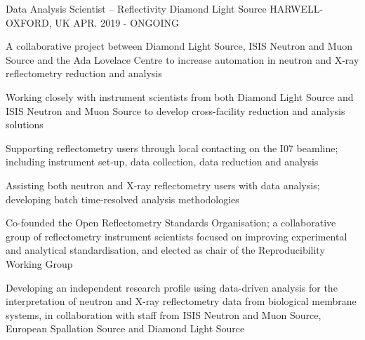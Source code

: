 \begin{cventries}
  \cventry
    {Data Analysis Scientist -- Reflectivity}
    {Diamond Light Source}
    {HARWELL-OXFORD, UK}
    {APR. 2019 - ONGOING}
    {
      \begin{cvitems}
        \item {A collaborative project between Diamond Light Source, ISIS Neutron and Muon Source and the Ada Lovelace Centre to increase automation in neutron and X-ray reflectometry reduction and analysis}
        \item {Working closely with instrument scientists from both Diamond Light Source and ISIS Neutron and Muon Source to develop cross-facility reduction and analysis solutions}
        \item {Supporting reflectometry users through local contacting on the I07 beamline; including instrument set-up, data collection, data reduction and analysis}
        \item {Assisting both neutron and X-ray reflectometry users with data analysis; developing batch time-resolved analysis methodologies}
        \item {Co-founded the Open Reflectometry Standards Organisation; a collaborative group of reflectometry instrument scientists focused on improving experimental and analytical standardisation, and elected as chair of the Reproducibility Working Group}
        \item {Developing an independent research profile using data-driven analysis for the interpretation of neutron and X-ray reflectometry data from biological membrane systems, in collaboration with staff from ISIS Neutron and Muon Source, European Spallation Source and Diamond Light Source}
      \end{cvitems}
    }
\end{cventries}
